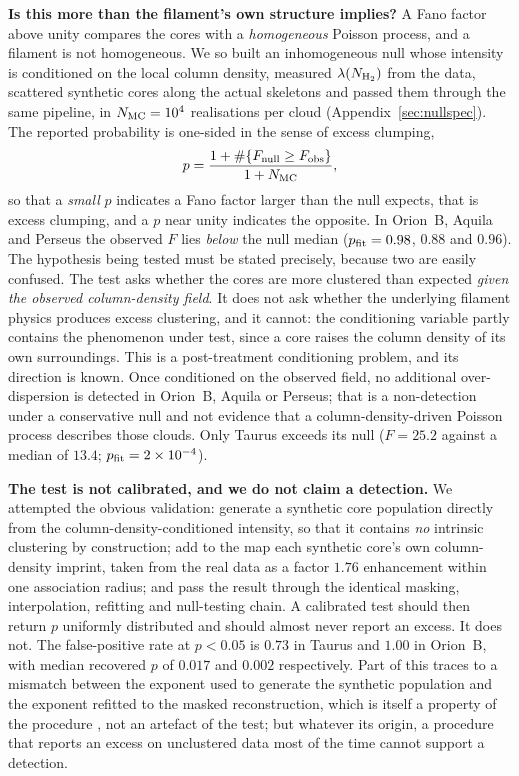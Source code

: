 \documentclass[usenatbib,twoside,twocolumn]{mnras}
\begin{document}
\smallskip\noindent\textbf{Is this more than the filament's own structure implies?} A Fano factor above unity compares the cores with a \emph{homogeneous} Poisson process, and a filament is not homogeneous. We so built an inhomogeneous null whose intensity is conditioned on the local column density, measured $\lambda(N_{\rm H_2})$ from the data, scattered synthetic cores along the actual skeletons and passed them through the same pipeline, in $N_{\rm MC}=10^4$ realisations per cloud (Appendix~\ref{sec:nullspec}). The reported probability is one-sided in the sense of excess clumping,
\begin{equation}
p=\frac{1+\#\{F_{\rm null}\geq F_{\rm obs}\}}{1+N_{\rm MC}},
\label{eq:pval}
\end{equation}
so that a \emph{small} $p$ indicates a Fano factor larger than the null expects, that is excess clumping, and a $p$ near unity indicates the opposite. In Orion~B, Aquila and Perseus the observed $F$ lies \emph{below} the null median ($p_{\rm fit}=0.98$, $0.88$ and $0.96$). The hypothesis being tested must be stated precisely, because two are easily confused. The test asks whether the cores are more clustered than expected \emph{given the observed column-density field}. It does not ask whether the underlying filament physics produces excess clustering, and it cannot: the conditioning variable partly contains the phenomenon under test, since a core raises the column density of its own surroundings. This is a post-treatment conditioning problem, and its direction is known. Once conditioned on the observed field, no additional over-dispersion is detected in Orion~B, Aquila or Perseus; that is a non-detection under a conservative null and not evidence that a column-density-driven Poisson process describes those clouds. Only Taurus exceeds its null ($F=25.2$ against a median of $13.4$; $p_{\rm fit}=2\times10^{-4}$).

\smallskip\noindent\textbf{The test is not calibrated, and we do not claim a detection.} We attempted the obvious validation: generate a synthetic core population directly from the column-density-conditioned intensity, so that it contains \emph{no} intrinsic clustering by construction; add to the map each synthetic core's own column-density imprint, taken from the real data as a factor $1.76$ enhancement within one association radius; and pass the result through the identical masking, interpolation, refitting and null-testing chain. A calibrated test should then return $p$ uniformly distributed and should almost never report an excess. It does not. The false-positive rate at $p<0.05$ is $0.73$ in Taurus and $1.00$ in Orion~B, with median recovered $p$ of $0.017$ and $0.002$ respectively. Part of this traces to a mismatch between the exponent used to generate the synthetic population and the exponent refitted to the masked reconstruction, which is itself a property of the procedure , not an artefact of the test; but whatever its origin, a procedure that reports an excess on unclustered data most of the time cannot support a detection.
\end{document}
